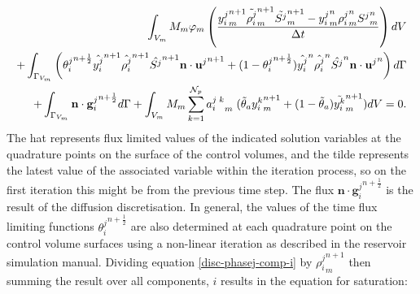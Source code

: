 \begin{eqnarray}
\int_{V_m} M_m \phi_m \left( \frac{ {y_{i}^{j}}_m^{n+1}
\tilde{\rho_i^{j}}_m^{n+1} \tilde{S^{j}}_m^{n+1}  -
{y_{i}^{j}}_m^n {\rho_i^{j}}_m^n {S^{j}}_m^n   }
{\Delta t} \right) dV \\
+
\int_{\Gamma_{V_m}} \left( {\theta_i^j}^{n+\frac{1}{2}}  \hat{y_{i}^{j}}^{n+1}
\hat{\rho_i^{j}}^{n+1} \hat{S^{j}}^{n+1} \mathbf{n}\cdot{\mathbf{u}^{j}}^{n+1}
+(1-{\theta_i^j}^{n+\frac{1}{2}}) \hat{y_{i}^{j}}^n
\hat{\rho_i^{j}}^n \hat{S^{j}}^n \mathbf{n}\cdot{\mathbf{u}^{j}}^n \right)  d\Gamma \\
+ \int_{\Gamma_{V_m}}  \mathbf{n}\cdot{\mathbf{g}_i^{j}}^{n+\frac{1}{2}}d\Gamma
+ \int_{V_m} M_m \sum_{k=1}^{{\cal N}_p} {a_i^{j\;k}}_m \;
(\tilde\theta_a {y_i^k}_m^{n+1} +(1-\tilde\theta_a) \tilde{y_i^k}_m^{n+1}) dV  = 0.
\label{disc-phasej-comp-i}
\end{eqnarray}
The hat represents flux limited values of the indicated solution variables at  the quadrature points on the surface of the control volumes, and the tilde  represents the latest value of the associated variable within the iteration  process, so on the first iteration this might be from the previous time step. The flux
$\mathbf{n}\cdot{\mathbf{g}_i^{j}}^{n+\frac{1}{2}}$ is the result of
the diffusion discretisation.
In general, the values of the time flux limiting functions  ${\theta_i^j}^{n+\frac{1}{2}}$ are also determined at each quadrature point on  the control volume surfaces using a non-linear iteration as described in the  reservoir simulation manual. Dividing equation \ref{disc-phasej-comp-i} by ${\rho_i^{j}}_m^{n+1}$ then summing the result over all components, $i$ results in the equation for saturation:


